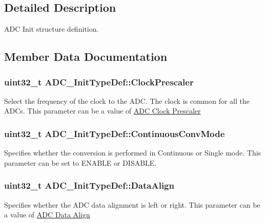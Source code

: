 \subsection{Detailed Description}
A\+DC Init structure definition. 

\subsection{Member Data Documentation}
\subsubsection[{\texorpdfstring{Clock\+Prescaler}{ClockPrescaler}}]{\setlength{\rightskip}{0pt plus 5cm}uint32\+\_\+t A\+D\+C\+\_\+\+Init\+Type\+Def\+::\+Clock\+Prescaler}\hypertarget{struct_a_d_c___init_type_def_a7e49d0db9ef7db8806bbfa57a1bd73a6}{}\label{struct_a_d_c___init_type_def_a7e49d0db9ef7db8806bbfa57a1bd73a6}
Select the frequency of the clock to the A\+DC. The clock is common for all the A\+D\+Cs. This parameter can be a value of \hyperlink{group___a_d_c___clock_prescaler}{A\+DC Clock Prescaler} 
\subsubsection[{\texorpdfstring{Continuous\+Conv\+Mode}{ContinuousConvMode}}]{\setlength{\rightskip}{0pt plus 5cm}uint32\+\_\+t A\+D\+C\+\_\+\+Init\+Type\+Def\+::\+Continuous\+Conv\+Mode}\hypertarget{struct_a_d_c___init_type_def_a4bf957b8be6ae85d71e9376e6f1e633b}{}\label{struct_a_d_c___init_type_def_a4bf957b8be6ae85d71e9376e6f1e633b}
Specifies whether the conversion is performed in Continuous or Single mode. This parameter can be set to E\+N\+A\+B\+LE or D\+I\+S\+A\+B\+LE. 
\subsubsection[{\texorpdfstring{Data\+Align}{DataAlign}}]{\setlength{\rightskip}{0pt plus 5cm}uint32\+\_\+t A\+D\+C\+\_\+\+Init\+Type\+Def\+::\+Data\+Align}\hypertarget{struct_a_d_c___init_type_def_af9ec9040d55aa68c23d92d174b464ac1}{}\label{struct_a_d_c___init_type_def_af9ec9040d55aa68c23d92d174b464ac1}
Specifies whether the A\+DC data alignment is left or right. This parameter can be a value of \hyperlink{group___a_d_c__data__align}{A\+DC Data Align} 
